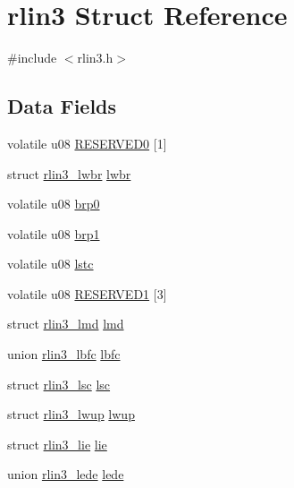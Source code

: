 \hypertarget{structrlin3}{}\section{rlin3 Struct Reference}
\label{structrlin3}


{\ttfamily \#include $<$rlin3.\+h$>$}

\subsection*{Data Fields}
\begin{DoxyCompactItemize}
\item 
volatile u08 \mbox{\hyperlink{structrlin3_a24285e09b0a0871ca09c167805b7c8fd}{R\+E\+S\+E\+R\+V\+E\+D0}} \mbox{[}1\mbox{]}
\item 
struct \mbox{\hyperlink{structrlin3__lwbr}{rlin3\+\_\+lwbr}} \mbox{\hyperlink{structrlin3_a68e16ae669f4704a3e830838b2294adf}{lwbr}}
\item 
volatile u08 \mbox{\hyperlink{structrlin3_abd35c5b53b755f95ec77e3357770f259}{brp0}}
\item 
volatile u08 \mbox{\hyperlink{structrlin3_a72990198361c89b405fdd37a42772133}{brp1}}
\item 
volatile u08 \mbox{\hyperlink{structrlin3_ab7f32a34a1550d705d29a3b5a95a9c03}{lstc}}
\item 
volatile u08 \mbox{\hyperlink{structrlin3_a6444109d1751b0da5f6bc00a4a798b36}{R\+E\+S\+E\+R\+V\+E\+D1}} \mbox{[}3\mbox{]}
\item 
struct \mbox{\hyperlink{structrlin3__lmd}{rlin3\+\_\+lmd}} \mbox{\hyperlink{structrlin3_a5ad92349d9ead7eff321831c26e40ebc}{lmd}}
\item 
union \mbox{\hyperlink{unionrlin3__lbfc}{rlin3\+\_\+lbfc}} \mbox{\hyperlink{structrlin3_a6b59ea0f9ea398af2c1987c215238039}{lbfc}}
\item 
struct \mbox{\hyperlink{structrlin3__lsc}{rlin3\+\_\+lsc}} \mbox{\hyperlink{structrlin3_a2c4fabec4110eaeca9f535aba1e6f72f}{lsc}}
\item 
struct \mbox{\hyperlink{structrlin3__lwup}{rlin3\+\_\+lwup}} \mbox{\hyperlink{structrlin3_a3c52d9d744eaacc42f9399eab0053fc9}{lwup}}
\item 
struct \mbox{\hyperlink{structrlin3__lie}{rlin3\+\_\+lie}} \mbox{\hyperlink{structrlin3_a95153dfa9878ca6c7a8c082f13e81143}{lie}}
\item 
union \mbox{\hyperlink{unionrlin3__lede}{rlin3\+\_\+lede}} \mbox{\hyperlink{structrlin3_ac770accf92f3a75a91f02c445d5819d6}{lede}}

\end{DoxyCompactItemize}
